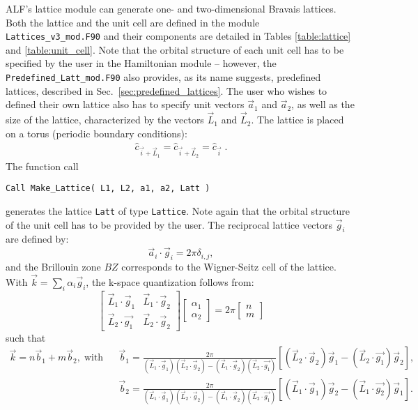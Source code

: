 ALF's lattice module can generate one- and two-dimensional Bravais lattices.
Both the lattice and the unit cell are defined in the module \texttt{Lattices\_v3\_mod.F90} and their components are detailed in Tables \ref{table:lattice} and \ref{table:unit_cell}. 
Note that the orbital structure of each unit cell has to be specified by the user in the Hamiltonian module -- however, the \texttt{Predefined\_Latt\_mod.F90} also provides, as its name suggests, predefined lattices, described in Sec.~\ref{sec:predefined_lattices}.
The user who wishes to defined their own lattice also has to specify unit vectors $\vec{a}_1$ and $\vec{a}_2$, as well as the size of the  lattice, characterized by the vectors $\vec{L}_1$ and $\vec{L}_2$. The lattice is placed on a torus (periodic boundary conditions):
\begin{align}
	\hat{c}_{\vec{i} + \vec{L}_1 }  = \hat{c}_{\vec{i} + \vec{L}_2 }  = \hat{c}_{\vec{i}}\;.
\end{align}
The function call 
\begin{lstlisting}[style=fortran]
Call Make_Lattice( L1, L2, a1, a2, Latt )
\end{lstlisting}
generates the lattice \texttt{Latt} of type \texttt{Lattice}.   Note again that  the orbital structure of the unit cell has to be provided by the user.    The reciprocal lattice vectors $\vec{g}_i$ are defined by: 
\begin{equation}
\label{Latt.G.eq}
	\vec{a}_i  \cdot \vec{g}_i = 2 \pi \delta_{i,j}, 
\end{equation}
and the Brillouin zone $BZ$ corresponds to the Wigner-Seitz cell of the lattice. 
With $\vec{k} = \sum_{i} \alpha_i  \vec{g}_i $, the  k-space quantization follows from: 
\begin{equation}
\begin{bmatrix}
	\vec{L}_1 \cdot \vec{g}_1  &  \vec{L}_1 \cdot \vec{g}_2  \\
	\vec{L}_2  \cdot \vec{g_1} & \vec{L}_2 \cdot  \vec{g}_2  
\end{bmatrix}
\begin{bmatrix}
   \alpha_1 \\
   \alpha_2
\end{bmatrix}
=  2 \pi 
\begin{bmatrix}
   n \\
   m
\end{bmatrix}
\end{equation}
such that 
\begin{eqnarray} \label{k.quant.eq}
     \vec{k} =  n \vec{b}_1  + m \vec{b}_2,\; \text{with}   & &   \vec{b}_1 = \frac{2 \pi}{ (\vec{L}_1 \cdot \vec{g}_1)  (\vec{L}_2 \cdot  \vec{g}_2 )  - (\vec{L}_1 \cdot \vec{g}_2) (\vec{L}_2  \cdot \vec{g_1} ) }   \left[  (\vec{L}_2 \cdot  \vec{g}_2) \vec{g}_1 -   (\vec{L}_2  \cdot \vec{g_1} ) \vec{g}_2 \right], \nonumber \\ 
        & & \vec{b}_2 = \frac{2 \pi}{ (\vec{L}_1 \cdot \vec{g}_1)  (\vec{L}_2 \cdot  \vec{g}_2 )  - (\vec{L}_1 \cdot \vec{g}_2) (\vec{L}_2  \cdot \vec{g_1} ) }   
           \left[  (\vec{L}_1 \cdot  \vec{g}_1) \vec{g}_2 -   (\vec{L}_1  \cdot \vec{g_2} ) \vec{g}_1 \right].
\end{eqnarray}

